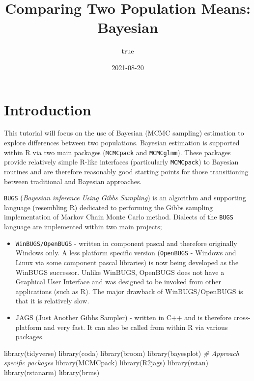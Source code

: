 \documentclass[
]{article}
\title{Comparing Two Population Means: Bayesian}
\author{true}
\date{2021-08-20}
\newenvironment{Shaded}{\begin{snugshade}}{\end{snugshade}}
\newcommand{\CommentTok}[1]{\textcolor[rgb]{0.56,0.35,0.01}{\textit{#1}}}
\newcommand{\FunctionTok}[1]{\textcolor[rgb]{0.00,0.00,0.00}{#1}}
\newcommand{\NormalTok}[1]{#1}
\begin{document}
\maketitle

{
\setcounter{tocdepth}{3}
\tableofcontents
}
\hypertarget{introduction}{%
\section{Introduction}\label{introduction}}

This tutorial will focus on the use of Bayesian (MCMC sampling)
estimation to explore differences between two populations. Bayesian
estimation is supported within R via two main packages
(\texttt{MCMCpack} and \texttt{MCMCglmm}). These packages provide
relatively simple R-like interfaces (particularly \texttt{MCMCpack}) to
Bayesian routines and are therefore reasonably good starting points for
those transitioning between traditional and Bayesian approaches.

\texttt{BUGS} (\emph{Bayesian inference Using Gibbs Sampling}) is an
algorithm and supporting language (resembling R) dedicated to performing
the Gibbs sampling implementation of Markov Chain Monte Carlo method.
Dialects of the \texttt{BUGS} language are implemented within two main
projects;

\begin{itemize}
\item
  \texttt{WinBUGS/OpenBUGS} - written in component pascal and therefore
  originally Windows only. A less platform specific version
  (\texttt{OpenBUGS} - Windows and Linux via some component pascal
  libraries) is now being developed as the WinBUGS successor. Unlike
  WinBUGS, OpenBUGS does not have a Graphical User Interface and was
  designed to be invoked from other applications (such as R). The major
  drawback of WinBUGS/OpenBUGS is that it is relatively slow.
\item
  JAGS (Just Another Gibbs Sampler) - written in C++ and is therefore
  cross-platform and very fast. It can also be called from within R via
  various packages.
\end{itemize}

\begin{Shaded}
\begin{Highlighting}[]
\FunctionTok{library}\NormalTok{(tidyverse)}
\FunctionTok{library}\NormalTok{(coda)}
\FunctionTok{library}\NormalTok{(broom)}
\FunctionTok{library}\NormalTok{(bayesplot)}
\CommentTok{\# Approach specific packages}
\FunctionTok{library}\NormalTok{(MCMCpack)}
\FunctionTok{library}\NormalTok{(R2jags)}
\FunctionTok{library}\NormalTok{(rstan)}
\FunctionTok{library}\NormalTok{(rstanarm)}
\FunctionTok{library}\NormalTok{(brms)}
\end{Highlighting}
\end{Shaded}
\end{document}

